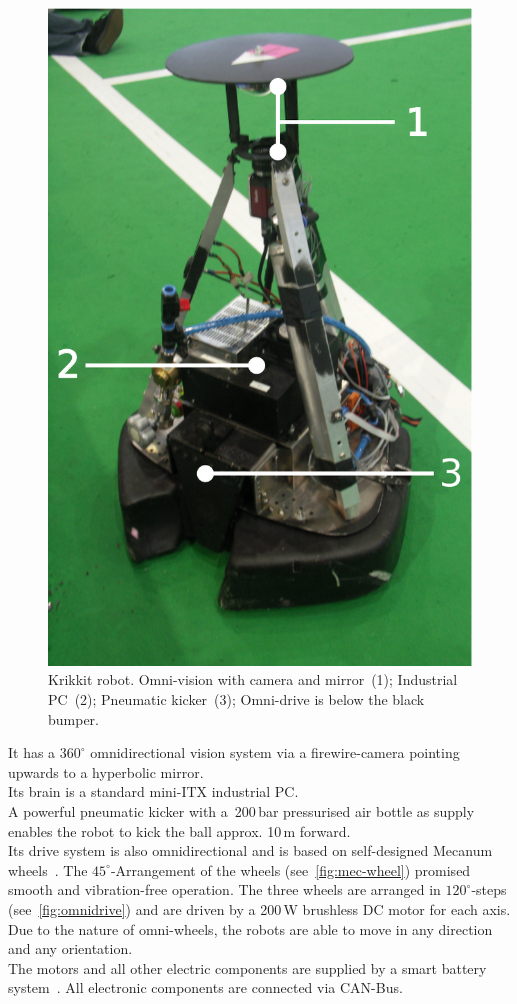 \documentclass[12pt,a4paper]{article}
\begin{document}
\begin{figure}[ht]
\begin{center}
\includegraphics[width=0.5\columnwidth]{figures/krikkit.pdf}
\caption{\label{fig:krikkit}
Krikkit robot. Omni-vision with camera and mirror~(1); Industrial PC~(2); Pneumatic kicker~(3); Omni-drive is below the black bumper.
}
\end{center}
\end{figure}

It has a $360^\circ$ omnidirectional vision system via a firewire-camera pointing upwards to a hyperbolic mirror.\\
Its brain is a standard mini-ITX industrial PC.\\
A powerful pneumatic kicker with a~200\,bar pressurised air bottle as supply enables the robot to kick the ball approx. 10\,m forward.\\
Its drive system is also omnidirectional and is based on self-designed Mecanum wheels~\cite{mecanum2007}. 
The $45^\circ$-Arrangement of the wheels (see~\autoref{fig:mec-wheel}) promised smooth and vibration-free operation.
The three wheels are arranged in $120^\circ$-steps (see~\autoref{fig:omnidrive}) and are driven by a 200\,W brushless DC motor for each axis.
Due to the nature of omni-wheels, the robots are able to move in any direction and any orientation.\\
The motors and all other electric components are supplied by a smart battery system~\cite{krammer06}.
All electronic components are connected via CAN-Bus.
\end{document}
